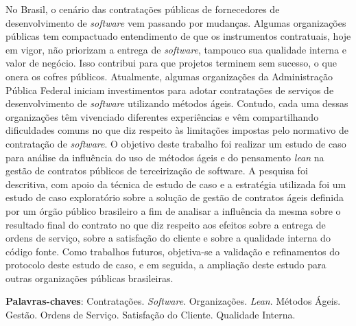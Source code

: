 \begin{resumo}
No Brasil, o cenário das contratações públicas de fornecedores de desenvolvimento de \textit{software} vem passando por mudanças. Algumas organizações públicas tem compactuado entendimento de que os instrumentos contratuais, hoje em vigor, não priorizam a entrega de \textit{software}, tampouco sua qualidade interna e valor de negócio. Isso contribui para que projetos terminem sem sucesso, o que onera os cofres públicos. Atualmente, algumas organizações da Administração Pública Federal iniciam investimentos para adotar contratações de serviços de desenvolvimento de \textit{software} utilizando métodos ágeis. Contudo, cada uma dessas organizações têm vivenciado diferentes experiências e vêm compartilhando dificuldades comuns no que diz respeito às limitações impostas pelo normativo de contratação de \textit{software}.  O objetivo deste trabalho foi realizar um estudo de caso para análise da influência do uso de métodos ágeis e do pensamento \textit{lean} na gestão de contratos públicos de terceirização de software. A pesquisa foi descritiva, com apoio da técnica de estudo de caso e a estratégia utilizada foi um estudo de caso exploratório sobre a solução de gestão de contratos ágeis definida por um órgão público brasileiro a fim de analisar a influência da mesma sobre o resultado final do contrato no que diz respeito aos efeitos sobre a entrega de ordens de serviço, sobre a satisfação do cliente e sobre a qualidade interna do código fonte. Como trabalhos futuros, objetiva-se a validação e refinamentos do protocolo deste estudo de caso, e em seguida, a ampliação deste estudo para outras organizações públicas brasileiras.

\vspace{\onelineskip}
    
 \noindent
 \textbf{Palavras-chaves}:  Contratações. \textit{Software}. Organizações. \textit{Lean}. Métodos Ágeis. Gestão. Ordens de Serviço. Satisfação do Cliente. Qualidade Interna.
\end{resumo}
